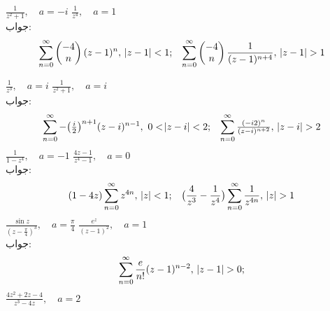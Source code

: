 \quad
$\tfrac{1}{z^2+1},\quad a=-i$
\quad
$\tfrac{1}{z^4},\quad a=1$\\
جواب:\quad
\begin{gather*}
\begin{aligned}
\sum\limits_{n=0}^{\infty} \begin{pmatrix} -4\\n \end{pmatrix} (z-1)^n,\,\,\abs{z-1}<1;
\end{aligned}\quad
\begin{aligned}
\sum\limits_{n=0}^{\infty} \begin{pmatrix}-4\\n  \end{pmatrix} \frac{1}{(z-1)^{n+4}},\,\, \abs{z-1}>1
\end{aligned}
\end{gather*}

\quad
$\tfrac{1}{z^3},\quad a=i$
\quad
$\tfrac{1}{z^2+1},\quad a=i$\\
جواب:\quad
\begin{gather*}
\begin{aligned}
\sum\limits_{n=0}^{\infty}- \big(\tfrac{i}{2}\big)^{n+1} (z-i)^{n-1},\,\,0<\abs{z-i}<2;
\end{aligned}\quad
\begin{aligned}
\sum\limits_{n=0}^{\infty} \tfrac{(-i2)^n}{(z-i)^{n+2}},\,\, \abs{z-i}>2
\end{aligned}
\end{gather*}
\quad
$\tfrac{1}{1-z^4},\quad a=-1$
\quad
$\tfrac{4z-1}{z^4-1},\quad a=0$\\
جواب:\quad
\begin{gather*}
\begin{aligned}
(1-4z)\sum\limits_{n=0}^{\infty}z^{4n},\,\,\abs{z}<1;
\end{aligned}\quad
\begin{aligned}
\big(\frac{4}{z^3}-\frac{1}{z^4}\big)\sum\limits_{n=0}^{\infty} \frac{1}{z^{4n}},\,\, \abs{z}>1
\end{aligned}
\end{gather*}
\quad
$\tfrac{\sin z}{(z-\tfrac{\pi}{4})^3},\quad a=\tfrac{\pi}{4}$
\quad
$\tfrac{e^z}{(z-1)^2},\quad a=1$\\
جواب:
\begin{align*}
\sum\limits_{n=0}^{\infty}\frac{e}{n!}(z-1)^{n-2},\,\,\abs{z-1}>0;
\end{align*}
\quad
$\tfrac{4z^2+2z-4}{z^3-4z},\quad a=2$

